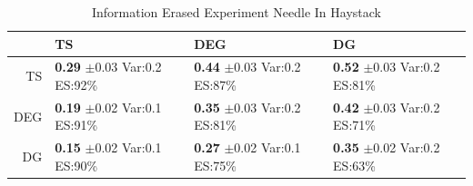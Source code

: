 \documentclass[11pt,letterpaper]{article}
\begin{document}
\begin{table}[ht]
\centering
\caption{Information Erased Experiment Needle In Haystack} 
\begin{tabular}{rlll}
  \hline
 & TS & DEG &  DG \\ 
  \hline
TS & \makecell{\textbf{0.29} $\pm$0.03\\Var:0.2\\ES:92\%} & \makecell{\textbf{0.44} $\pm$0.03\\Var:0.2\\ES:87\%} & \makecell{\textbf{0.52} $\pm$0.03\\Var:0.2\\ES:81\%} \\ 
  DEG & \makecell{\textbf{0.19} $\pm$0.02\\Var:0.1\\ES:91\%} & \makecell{\textbf{0.35} $\pm$0.03\\Var:0.2\\ES:81\%} & \makecell{\textbf{0.42} $\pm$0.03\\Var:0.2\\ES:71\%} \\ 
   DG & \makecell{\textbf{0.15} $\pm$0.02\\Var:0.1\\ES:90\%} & \makecell{\textbf{0.27} $\pm$0.02\\Var:0.1\\ES:75\%} & \makecell{\textbf{0.35} $\pm$0.02\\Var:0.2\\ES:63\%} \\ 
   \hline
\end{tabular}
\end{table}
\end{document}
